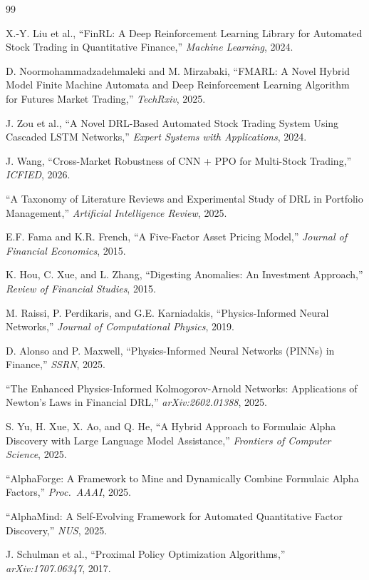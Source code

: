 \documentclass[11pt,a4paper]{article}
\begin{document}

\begin{thebibliography}{99}

X.-Y. Liu et al., ``FinRL: A Deep Reinforcement Learning Library for Automated Stock Trading in Quantitative Finance,'' \emph{Machine Learning}, 2024.

D. Noormohammadzadehmaleki and M. Mirzabaki, ``FMARL: A Novel Hybrid Model Finite Machine Automata and Deep Reinforcement Learning Algorithm for Futures Market Trading,'' \emph{TechRxiv}, 2025.

J. Zou et al., ``A Novel DRL-Based Automated Stock Trading System Using Cascaded LSTM Networks,'' \emph{Expert Systems with Applications}, 2024.

J. Wang, ``Cross-Market Robustness of CNN + PPO for Multi-Stock Trading,'' \emph{ICFIED}, 2026.

``A Taxonomy of Literature Reviews and Experimental Study of DRL in Portfolio Management,'' \emph{Artificial Intelligence Review}, 2025.

E.F. Fama and K.R. French, ``A Five-Factor Asset Pricing Model,'' \emph{Journal of Financial Economics}, 2015.

K. Hou, C. Xue, and L. Zhang, ``Digesting Anomalies: An Investment Approach,'' \emph{Review of Financial Studies}, 2015.

M. Raissi, P. Perdikaris, and G.E. Karniadakis, ``Physics-Informed Neural Networks,'' \emph{Journal of Computational Physics}, 2019.

D. Alonso and P. Maxwell, ``Physics-Informed Neural Networks (PINNs) in Finance,'' \emph{SSRN}, 2025.

``The Enhanced Physics-Informed Kolmogorov-Arnold Networks: Applications of Newton's Laws in Financial DRL,'' \emph{arXiv:2602.01388}, 2025.

S. Yu, H. Xue, X. Ao, and Q. He, ``A Hybrid Approach to Formulaic Alpha Discovery with Large Language Model Assistance,'' \emph{Frontiers of Computer Science}, 2025.

``AlphaForge: A Framework to Mine and Dynamically Combine Formulaic Alpha Factors,'' \emph{Proc.\ AAAI}, 2025.

``AlphaMind: A Self-Evolving Framework for Automated Quantitative Factor Discovery,'' \emph{NUS}, 2025.

J. Schulman et al., ``Proximal Policy Optimization Algorithms,'' \emph{arXiv:1707.06347}, 2017.

\end{thebibliography}
\end{document}
